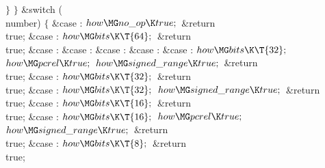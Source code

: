 \4${}\}{}$\2\6
\4${}\}{}$\2\6
\&{switch} (\\{number})\5
${}\{{}$\1\6
\4\&{case} :\5
${}\\{how}\MG\\{no\_op}\K\\{true};{}$\6
\&{return} \\{true};\6
\4\&{case} :\5
${}\\{how}\MG\\{bits}\K\T{64};{}$\6
\&{return} \\{true};\6
\4\&{case} :\5
\&{case} :\5
\&{case} :\5
\&{case} :\5
\&{case} :\5
${}\\{how}\MG\\{bits}\K\T{32};{}$\6
${}\\{how}\MG\\{pcrel}\K\\{true};{}$\6
${}\\{how}\MG\\{signed\_range}\K\\{true};{}$\6
\&{return} \\{true};\6
\4\&{case} :\5
${}\\{how}\MG\\{bits}\K\T{32};{}$\6
\&{return} \\{true};\6
\4\&{case} :\5
${}\\{how}\MG\\{bits}\K\T{32};{}$\6
${}\\{how}\MG\\{signed\_range}\K\\{true};{}$\6
\&{return} \\{true};\6
\4\&{case} :\5
${}\\{how}\MG\\{bits}\K\T{16};{}$\6
\&{return} \\{true};\6
\4\&{case} :\5
${}\\{how}\MG\\{bits}\K\T{16};{}$\6
${}\\{how}\MG\\{pcrel}\K\\{true};{}$\6
${}\\{how}\MG\\{signed\_range}\K\\{true};{}$\6
\&{return} \\{true};\6
\4\&{case} :\5
${}\\{how}\MG\\{bits}\K\T{8};{}$\6
\&{return} \\{true};\6
